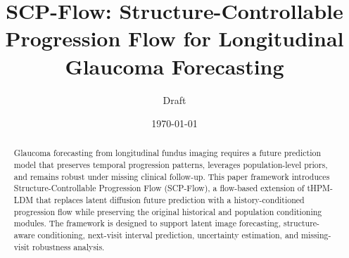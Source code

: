 \documentclass[11pt]{article}
\title{SCP-Flow: Structure-Controllable Progression Flow for Longitudinal Glaucoma Forecasting}
\author{Draft}
\date{\today}
\begin{document}
\maketitle

\begin{abstract}
Glaucoma forecasting from longitudinal fundus imaging requires a future prediction model that preserves temporal progression patterns, leverages population-level priors, and remains robust under missing clinical follow-up. This paper framework introduces Structure-Controllable Progression Flow (SCP-Flow), a flow-based extension of tHPM-LDM that replaces latent diffusion future prediction with a history-conditioned progression flow while preserving the original historical and population conditioning modules. The framework is designed to support latent image forecasting, structure-aware conditioning, next-visit interval prediction, uncertainty estimation, and missing-visit robustness analysis.
\end{abstract}

\tableofcontents










\end{document}

